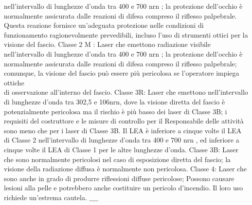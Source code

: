 \documentclass[10pt]{article}
\begin{document}
nell'intervallo di lunghezze d'onda tra 400 e 700 nrn ; la protezione dell'occhio è normalmente assicurata dalle reazioni di difesa compreso il riflesso palpebrale. Questa reazione fornisce un'adeguata protezione nelle condizioni di funzionamento ragionevolmente prevedibili, incluso l'uso di strumenti ottici per la visione del fascio. Classe 2 M : Laser che emettono radiazione visibile nell'intervallo di lunghezze d'onda tra 400 e 700 nrn ; la protezione dell'occhio è normalmente assicurata dalle reazioni di difesa compreso il riflesso palpebrale; comunque, la visione del fascio può essere più pericolosa se l'operatore impiega ottiche\\
di osservazione all'interno del fascio. Classe 3R: Laser che emettono nell'intervallo di lunghezze d'onda tra 302,5 e 106nrn, dove la visione diretta del fascio è potenzialmente pericolosa ma il rischio è più basso dei laser di Classe 3B; i requisiti del costruttore e le misure di controllo per il Responsabile delle attività sono meno che per i laser di Classe 3B. Il LEA è inferiore a cinque volte il LEA di Classe 2 nell'intervallo di lunghezze d'onda tra 400 e 700 nrn , ed inferiore a cinque volte il LEA di Classe 1 per le altre lunghezze d'onda. Classe 3B: Laser che sono normalmente pericolosi nel caso di esposizione diretta del fascio; la visione della radiazione diffusa è normalmente non pericolosa. Classe 4: Laser che sono anche in grado di produrre riflessioni diffuse pericolose; Possono causare lesioni alla pelle e potrebbero anche costituire un pericolo d'incendio. Il loro uso richiede un'estrema cautela. $\_\_\_\_$
\end{document}
